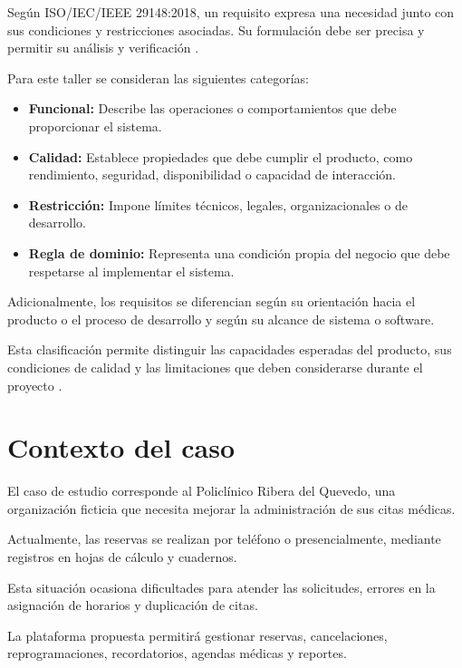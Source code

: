 \documentclass[12pt,a4paper]{article}
\begin{document}
Según ISO/IEC/IEEE 29148:2018, un requisito
expresa una necesidad junto con sus condiciones
y restricciones asociadas. Su formulación debe
ser precisa y permitir su análisis y
verificación \cite{iso29148}.

Para este taller se consideran las siguientes
categorías:

\begin{itemize}

\item \textbf{Funcional:}
Describe las operaciones o comportamientos
que debe proporcionar el sistema.

\item \textbf{Calidad:}
Establece propiedades que debe cumplir el
producto, como rendimiento, seguridad,
disponibilidad o capacidad de interacción.

\item \textbf{Restricción:}
Impone límites técnicos, legales,
organizacionales o de desarrollo.

\item \textbf{Regla de dominio:}
Representa una condición propia del negocio
que debe respetarse al implementar el sistema.

\end{itemize}

Adicionalmente, los requisitos se diferencian
según su orientación hacia el producto o el
proceso de desarrollo y según su alcance
de sistema o software.

Esta clasificación permite distinguir
las capacidades esperadas del producto,
sus condiciones de calidad y las limitaciones
que deben considerarse durante el proyecto
\cite{pohl2025}.

\section{Contexto del caso}

El caso de estudio corresponde al
Policlínico Ribera del Quevedo, una
organización ficticia que necesita mejorar
la administración de sus citas médicas.

Actualmente, las reservas se realizan por
teléfono o presencialmente, mediante registros
en hojas de cálculo y cuadernos.

Esta situación ocasiona dificultades para
atender las solicitudes, errores en la
asignación de horarios y duplicación de citas.

La plataforma propuesta permitirá gestionar
reservas, cancelaciones, reprogramaciones,
recordatorios, agendas médicas y reportes.
\end{document}
